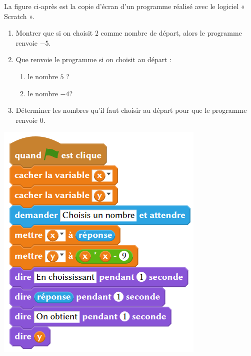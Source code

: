 
\begin{minipage}{0.48\linewidth}

La figure ci-après est la copie d’écran d’un programme réalisé avec le logiciel « Scratch ».
\begin{enumerate}
\item Montrer que si on choisit $2$ comme nombre de départ, alors le programme renvoie $-5$.
\item Que renvoie le programme si on choisit au départ :
\begin{enumerate}
\item le nombre $5$ ?
\item le nombre $-4$?
\end{enumerate}
\item Déterminer  les  nombres qu’il faut choisir au départ pour  que  le  programme renvoie 0.
\end{enumerate}

\end{minipage}
\hfill
\begin{minipage}{0.48\linewidth}
\includegraphics[scale=0.6]{NF-54.png} 
\end{minipage}